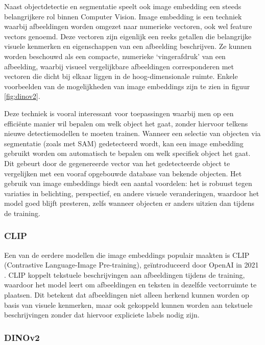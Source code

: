 Naast objectdetectie en segmentatie speelt ook image embedding een steeds belangrijkere rol binnen Computer Vision. 
Image embedding is een techniek waarbij afbeeldingen worden omgezet naar numerieke vectoren, ook wel feature vectors genoemd. 
Deze vectoren zijn eigenlijk een reeks getallen die belangrijke visuele kenmerken en eigenschappen van een afbeelding beschrijven. 
Ze kunnen worden beschouwd als een compacte, numerieke `vingerafdruk' van een afbeelding, waarbij visueel vergelijkbare afbeeldingen corresponderen met vectoren die dicht bij elkaar liggen in de hoog-dimensionale ruimte.
Enkele voorbeelden van de mogelijkheden van image embeddings zijn te zien in figuur \ref{fig:dinov2}.
\newline \par
Deze techniek is vooral interessant voor toepassingen waarbij men op een efficiënte manier wil bepalen om welk object het gaat, zonder hiervoor telkens nieuwe detectiemodellen te moeten trainen. 
Wanneer een selectie van objecten via segmentatie (zoals met SAM) gedetecteerd wordt, kan een image embedding gebruikt worden om automatisch te bepalen om welk specifiek object het gaat. 
Dit gebeurt door de gegenereerde vector van het gedetecteerde object te vergelijken met een vooraf opgebouwde database van bekende objecten. 
Het gebruik van image embeddings biedt een aantal voordelen: het is robuust tegen variaties in belichting, perspectief, en andere visuele veranderingen, waardoor het model goed blijft presteren, zelfs wanneer objecten er anders uitzien dan tijdens de training.

\subsubsection{CLIP}

Een van de eerdere modellen die image embeddings populair maakten is CLIP (Contrastive Language-Image Pre-training), geïntroduceerd door OpenAI in 2021 \autocite{Radford2021}.
CLIP koppelt tekstuele beschrijvingen aan afbeeldingen tijdens de training, waardoor het model leert om afbeeldingen en teksten in dezelfde vectorruimte te plaatsen. 
Dit betekent dat afbeeldingen niet alleen herkend kunnen worden op basis van visuele kenmerken, maar ook gekoppeld kunnen worden aan tekstuele beschrijvingen zonder dat hiervoor expliciete labels nodig zijn.

\subsubsection{DINOv2}

